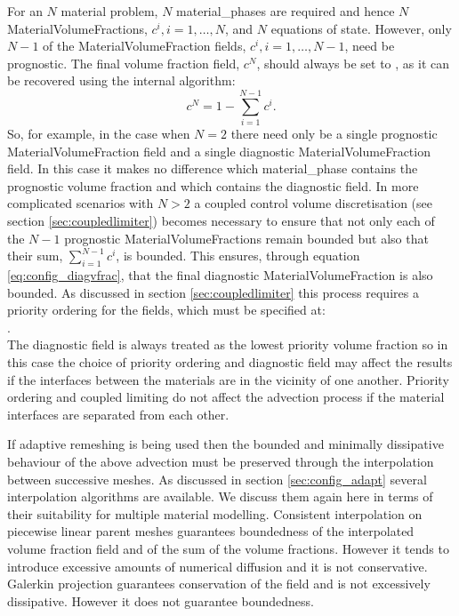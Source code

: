 For an $N$ material problem, $N$ material\_phases are required and hence $N$ MaterialVolumeFractions, $c^i, i =1, \ldots, N$, and $N$ equations of state.  However, only $N-1$ of the MaterialVolumeFraction fields, $c^i, i =1, \ldots, N-1$, need be prognostic.  The final volume fraction field, $c^N$, should always be set to , as it can be recovered using the internal algorithm:
\begin{equation} \label{eq:config_diagvfrac}
c^N = 1 - \sum_{i=1}^{N-1}c^i\textrm{.}
\end{equation}
So, for example, in the case when $N=2$ there need only be a single prognostic MaterialVolumeFraction field and a single diagnostic MaterialVolumeFraction field.  In this case it makes no difference which material\_phase contains the prognostic volume fraction and which contains the diagnostic field.  In more complicated scenarios with $N>2$ a coupled control volume discretisation (see section \ref{sec:coupledlimiter}) becomes necessary to ensure that not only each of the $N-1$ prognostic MaterialVolumeFractions remain bounded but also that their sum, $\sum_{i=1}^{N-1}c^i$, is bounded.  This ensures, through equation \ref{eq:config_diagvfrac}, that the final diagnostic MaterialVolumeFraction is also bounded.  As discussed in section \ref{sec:coupledlimiter} this process requires a priority ordering for the fields, which must be specified at:\\
.\\
The diagnostic field is always treated as the lowest priority volume fraction so in this case the choice of priority ordering and diagnostic field may affect the results if the interfaces between the materials are in the vicinity of one another.  Priority ordering and coupled limiting do not affect the advection process if the material interfaces are separated from each other.

If adaptive remeshing is being used then the bounded and minimally dissipative behaviour of the above advection must be preserved through the interpolation between successive meshes.  As discussed in section \ref{sec:config_adapt} several interpolation algorithms are available.  We discuss them again here in terms of their suitability for multiple material modelling.  Consistent interpolation on piecewise linear parent meshes guarantees boundedness of the interpolated volume fraction field and of the sum of the volume fractions.  However it tends to introduce excessive amounts of numerical diffusion and it is not conservative.  Galerkin projection guarantees conservation of the field and is not excessively dissipative.  However it does not guarantee boundedness.

